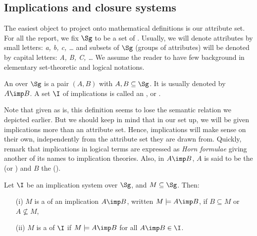 
\subsection{Implications and closure systems}

The easiest object to project onto mathematical definitions is our attribute
set. For all the report, we fix $\Sg$ to be a set of . 
Usually, we will denote attributes by small letters: \textit{a, b, c, \dots} 
and subsets of $\Sg$ (groups of attributes) will be denoted by capital letters: 
\textit{A, B, C, \dots} We assume the reader to have few background in 
elementary set-theoretic and logical notations. 

\begin{definition} An 
 over $\Sg$ is a pair $(A, B)$ with $A, B \subseteq \Sg$. 
It is usually denoted by $A \imp B$. A set $\I$ of implications is called an 
,  or 
.
\end{definition}

\noindent Note that given as is, this definition seems to lose the semantic
relation we depicted earlier. But we should keep in mind that in our set up, we
will be given implications more than an attribute set. Hence, implications will
make sense on their own, independently from the attribute set they are drawn 
from. Quickly, remark that implications in logical terms are expressed as
\textit{Horn formulae} giving another of its names to implication theories. 
Also, in $A \imp B$, $A$ is said to be the  (or ) 
and $B$ the  ().

\begin{definition} Let $\I$ be an implication system over 
	$\Sg$, and $M \subseteq \Sg$. Then:
	\begin{itemize}
		\item[(i)] $M$ is a  of an implication $A \imp B$, 
		written 
		$M \models A \imp B$, if $B \subseteq M$ or $A \nsubseteq M$,
		\item[(ii)] $M$ is a  of $\I$ if $M \models A \imp B$ for 
		all
		$A \imp B \in \I$.
	\end{itemize}
	
\end{definition}

